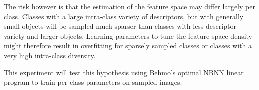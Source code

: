 The risk however is that the estimation of the feature space may differ largely per class. Classes with a large intra-class variety of descriptors, but with generally small objects will be sampled much sparser than classes with less descriptor variety and larger objects. Learning parameters to tune the feature space density might therefore result in overfitting for sparsely sampled classes or classes with a very high intra-class diversity.

This experiment will test this hypothesis using Behmo's optimal NBNN linear program to train per-class parameters on sampled images.


\begin{figure}[hbt]
    \centering
\end{figure}


